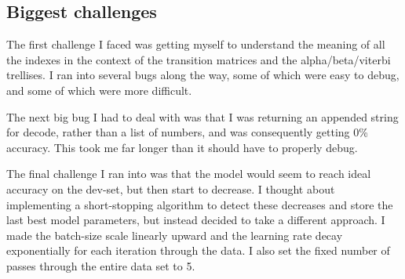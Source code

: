 \subsection*{Biggest challenges}

The first challenge I faced was getting myself to understand the meaning of all the indexes in the context of the transition matrices and the alpha/beta/viterbi trellises. I ran into several bugs along the way, some of which were easy to debug, and some of which were more difficult.

The next big bug I had to deal with was that I was returning an appended string for decode, rather than a list of numbers, and was consequently getting 0\% accuracy. This took me far longer than it should have to properly debug.

The final challenge I ran into was that the model would seem to reach ideal accuracy on the dev-set, but then start to decrease. I thought about implementing a short-stopping algorithm to detect these decreases and store the last best model parameters, but instead decided to take a different approach. I made the batch-size scale linearly upward and the learning rate decay exponentially for each iteration through the data. I also set the fixed number of passes through the entire data set to 5.



